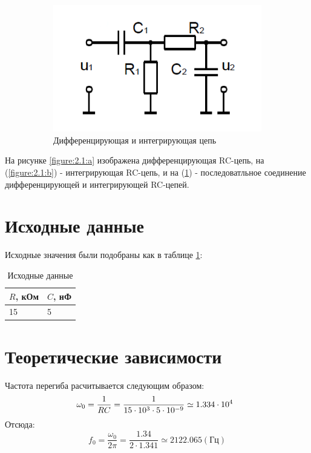 \begin{figure}[h]
\begin{subfigure}[b]{0.3\textwidth}
\includegraphics[scale=0.4]{img/v_scheme.png}
\caption{Дифференцирующая и интегрирующая цепь}\label{figure:2.1:c}
\end{subfigure}
\caption{}\label{figure:2.1}
\end{figure}
На рисунке \ref{figure:2.1:a} изображена дифференцирующая RC-цепь, на (\ref{figure:2.1:b}) - интегрирующая RC-цепь, и на  (\ref{figure:2.1:c}) - последоватльное соединение дифференцирующей и интегрирующей RC-­цепей.


\section{Исходные данные}
Исходные значения были подобраны как в таблице \ref{tabular:11}:

\begin{table}[H]
	\begin{center}
	\caption{Исходные данные}
	\def\arraystretch{1.5}
		\begin{tabularx}{\textwidth}{|X|X|}
			\hline
			$R$, кОм & $C$, нФ\\\hline
		     15 & 5\\\hline	
		\end{tabularx}
		\label{tabular:11}
	\end{center}
\end{table}

\section{Теоретические зависимости}
Частота перегиба расчитывается следующим образом:
\begin{equation}
\omega_0 = \frac{1}{RC} = \frac{1}{15 \cdot 10^3 \cdot 5 \cdot 10^{-9}} \simeq 1.334 \cdot 10^4 \hspace*{2mm}
\end{equation}
Отсюда: 
\begin{equation}
f_0 = \frac{\omega_0}{2 \pi} = \frac{1.34}{2\cdot1.341} \simeq 2122.065 (\text{Гц})
\end{equation}

